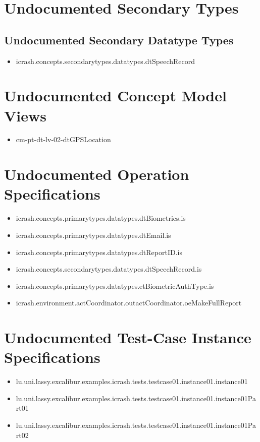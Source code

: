 \section[Undocumented Secondary Types]{Undocumented Secondary Types}


\subsection[Undocumented Secondary Datatype Types]{Undocumented Secondary Datatype Types}
\begin{itemize}
\item icrash.concepts.secondarytypes.datatypes.dtSpeechRecord 
\end{itemize}








\section[Undocumented Concept Model Views]{Undocumented Concept Model Views}
\begin{itemize}
\item cm-pt-dt-lv-02-dtGPSLocation 
\end{itemize}


\section[Undocumented Operation Specifications]{Undocumented Operation Specifications}
\begin{itemize}
\item icrash.concepts.primarytypes.datatypes.dtBiometrics.is 
\item icrash.concepts.primarytypes.datatypes.dtEmail.is 
\item icrash.concepts.primarytypes.datatypes.dtReportID.is 
\item icrash.concepts.secondarytypes.datatypes.dtSpeechRecord.is 
\item icrash.concepts.primarytypes.datatypes.etBiometricAuthType.is 
\item icrash.environment.actCoordinator.outactCoordinator.oeMakeFullReport 
\end{itemize}





\section[Undocumented Test-Case Instance Specifications]{Undocumented Test-Case Instance Specifications}
\begin{itemize}
\item lu.uni.lassy.excalibur.examples.icrash.tests.testcase01.instance01.instance01 
\item lu.uni.lassy.excalibur.examples.icrash.tests.testcase01.instance01.instance01Part01 
\item lu.uni.lassy.excalibur.examples.icrash.tests.testcase01.instance01.instance01Part02 
\end{itemize}




